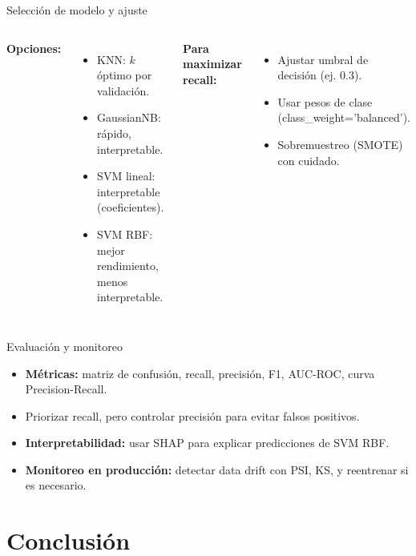 \documentclass[aspectratio=169, 10pt, xcolor=table]{beamer}
\begin{document}
\begin{frame}{Selección de modelo y ajuste}
    \begin{columns}[t]
        \textbf{Opciones:}
        \begin{itemize}
            \item KNN: $k$ óptimo por validación.
            \item GaussianNB: rápido, interpretable.
            \item SVM lineal: interpretable (coeficientes).
            \item SVM RBF: mejor rendimiento, menos interpretable.
        \end{itemize}
        \textbf{Para maximizar recall:}
        \begin{itemize}
            \item Ajustar umbral de decisión (ej. 0.3).
            \item Usar pesos de clase (class\_weight='balanced').
            \item Sobremuestreo (SMOTE) con cuidado.
        \end{itemize}
    \end{columns}
\end{frame}

\begin{frame}{Evaluación y monitoreo}
    \begin{itemize}
        \item \textbf{Métricas:} matriz de confusión, recall, precisión, F1, AUC-ROC, curva Precision-Recall.
        \item Priorizar recall, pero controlar precisión para evitar falsos positivos.
        \item \textbf{Interpretabilidad:} usar SHAP para explicar predicciones de SVM RBF.
        \item \textbf{Monitoreo en producción:} detectar data drift con PSI, KS, y reentrenar si es necesario.
    \end{itemize}
\end{frame}

\section{Conclusión}
\end{document}
